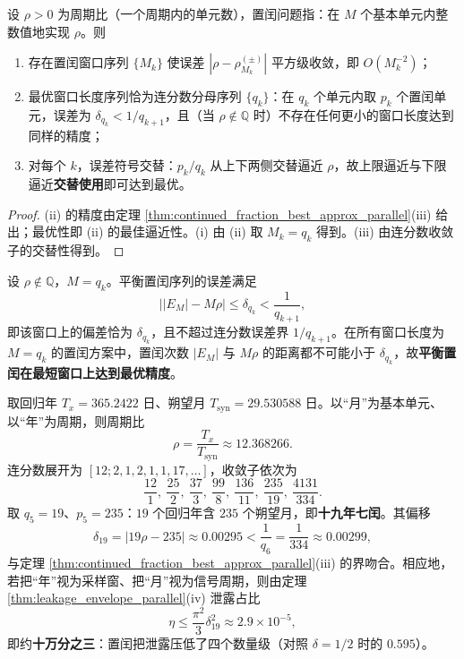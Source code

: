 \begin{theorem}[最佳置闰]\label{thm:best_intercalation_parallel}
设 $\rho>0$ 为周期比（一个周期内的单元数），置闰问题指：在 $M$ 个基本单元内整数值地实现 $\rho$。则
\begin{enumerate}[label=(\roman*)]
    \item 存在置闰窗口序列 $\{M_k\}$ 使误差 $|\rho-\rho^{(\pm)}_{M_k}|$ 平方级收敛，即 $O(M_k^{-2})$；
    \item 最优窗口长度序列恰为连分数分母序列 $\{q_k\}$：在 $q_k$ 个单元内取 $p_k$ 个置闰单元，误差为 $\delta_{q_k}<1/q_{k+1}$，且（当 $\rho\notin\mathbb{Q}$ 时）不存在任何更小的窗口长度达到同样的精度；
    \item 对每个 $k$，误差符号交替：$p_k/q_k$ 从上下两侧交替逼近 $\rho$，故上限逼近与下限逼近\textbf{交替使用}即可达到最优。
\end{enumerate}
\end{theorem}

\begin{proof}
(ii) 的精度由定理 \ref{thm:continued_fraction_best_approx_parallel}(iii) 给出；最优性即 (ii) 的最佳逼近性。(i) 由 (ii) 取 $M_k=q_k$ 得到。(iii) 由连分数收敛子的交替性得到。
\end{proof}

\begin{corollary}[平衡置闰的最优性]\label{cor:balanced_intercalation_optimal}
设 $\rho\notin\mathbb{Q}$，$M=q_k$。平衡置闰序列的误差满足
\[
\big||E_M|-M\rho\big|\le\delta_{q_k}<\frac1{q_{k+1}},
\]
即该窗口上的偏差恰为 $\delta_{q_k}$，且不超过连分数误差界 $1/q_{k+1}$。在所有窗口长度为 $M=q_k$ 的置闰方案中，置闰次数 $|E_M|$ 与 $M\rho$ 的距离都不可能小于 $\delta_{q_k}$，故\textbf{平衡置闰在最短窗口上达到最优精度}。
\end{corollary}

\begin{example}[19 年 7 闰的定量分析]\label{ex:metonic_parallel}
取回归年 $T_x=365.2422$ 日、朔望月 $T_{\mathrm{syn}}=29.530588$ 日。以“月”为基本单元、以“年”为周期，则周期比
\[
\rho=\frac{T_x}{T_{\mathrm{syn}}}\approx12.368266 .
\]
连分数展开为 $[12;2,1,2,1,1,17,\dots]$，收敛子依次为
\[
\frac{12}{1},\ \frac{25}{2},\ \frac{37}{3},\ \frac{99}{8},\ \frac{136}{11},\ \frac{235}{19},\ \frac{4131}{334}.
\]
取 $q_5=19$、$p_5=235$：$19$ 个回归年含 $235$ 个朔望月，即\textbf{十九年七闰}。其偏移
\[
\delta_{19}=|19\rho-235|\approx0.00295<\frac1{q_6}=\frac1{334}\approx0.00299,
\]
与定理 \ref{thm:continued_fraction_best_approx_parallel}(iii) 的界吻合。相应地，若把“年”视为采样窗、把“月”视为信号周期，则由定理 \ref{thm:leakage_envelope_parallel}(iv) 泄露占比
\[
\eta\le\frac{\pi^2}{3}\delta_{19}^2\approx2.9\times10^{-5},
\]
即约\textbf{十万分之三}：置闰把泄露压低了四个数量级（对照 $\delta=1/2$ 时的 $0.595$）。
\end{example}

